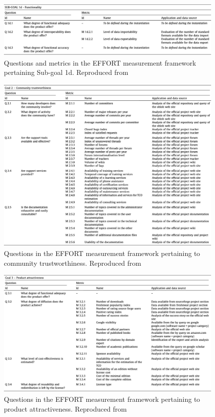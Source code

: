 \begin{figure}[h!]
\centering
\includegraphics{images/table_5}
\caption{Questions and metrics in the EFFORT measurement framework pertaining Sub-goal 1d. Reproduced from~\cite{effort}}
\label{image_effort_table_5}
\end{figure}

\begin{figure}[h!]
\centering
\includegraphics{images/table_6}
\caption{Questions in the EFFORT measurement framework pertaining to community trustworthiness. Reproduced from~\cite{effort}}
\label{image_effort_table_6}
\end{figure}

\begin{figure}[h!]
\centering
\includegraphics{images/table_7}
\caption{Questions in the EFFORT measurement framework pertaining to product attractiveness. Reproduced from~\cite{effort}}
\label{image_effort_table_7}
\end{figure}

